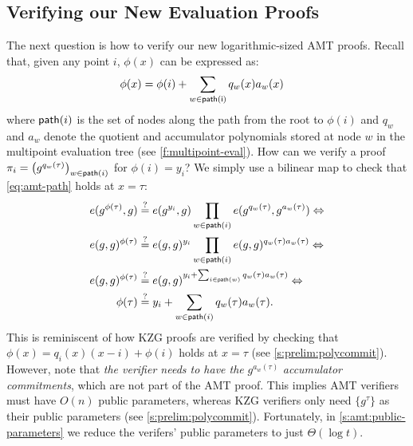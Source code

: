 \subsection{Verifying our New Evaluation Proofs}
\label{s:amt:verifying-proofs}
The next question is how to verify our new logarithmic-sized AMT proofs.
Recall that, given any point $i$, $\phi(x)$ can be expressed as:
\begin{align}
\label{eq:amt-path}
\phi(x) &= \phi(i) + \sum_{w\in \mathsf{\mathsf{path}(i)}} q_w(x) a_w(x)
\end{align}
where $\mathsf{path}(i)$ is the set of nodes along the path from the root to $\phi(i)$ and $q_w$ and $a_w$ denote the quotient and accumulator polynomials stored at node $w$ in the multipoint evaluation tree (see \cref{f:multipoint-eval}).
How can we verify a proof $\pi_i = \left(g^{q_w(\tau)}\right)_{w\in\mathsf{path}(i)}$ for $\phi(i) = y_i$?
We simply use a bilinear map to check that \cref{eq:amt-path} holds at $x=\tau$:
\begin{align}
\label{eq:amt-verify}
e(g^{\phi(\tau)}, g) &\stackrel{?}{=} e(g^{y_i},g) \prod_{w\in\mathsf{path}(i)} e(g^{q_w(\tau)}, g^{a_w(\tau)}) \Leftrightarrow\\ \nonumber
e(g, g)^{\phi(\tau)} &\stackrel{?}{=} e(g,g)^{y_i} \prod_{w\in\mathsf{path}(i)} e(g,g)^{q_w(\tau) a_w(\tau)}\Leftrightarrow\\ \nonumber
e(g, g)^{\phi(\tau)} &\stackrel{?}{=} e(g,g)^{{y_i}+\sum_{i\in\mathsf{path}(w)} {q_w(\tau) a_w(\tau)}}\Leftrightarrow\\ \nonumber
         \phi(\tau)  &\stackrel{?}{=} {y_i}+\sum_{w\in\mathsf{path}(i)} {q_w(\tau) a_w(\tau)}.
\end{align}
This is reminiscent of how KZG proofs are verified by checking that $\phi(x) = q_i(x)(x-i) + \phi(i)$ holds at $x=\tau$ (see \cref{s:prelim:polycommit}).
However, note that \textit{the verifier needs to have the} $g^{a_w(\tau)}$ \textit{accumulator commitments}, which are not part of the AMT proof.
This implies AMT verifiers must have $O(n)$ public parameters, whereas KZG verifiers only need $\{g^\tau\}$ as their public parameters (see \cref{s:prelim:polycommit}).
Fortunately, in \cref{s:amt:public-parameters} we reduce the verifers' public parameters to just $\Theta(\log{t})$.

